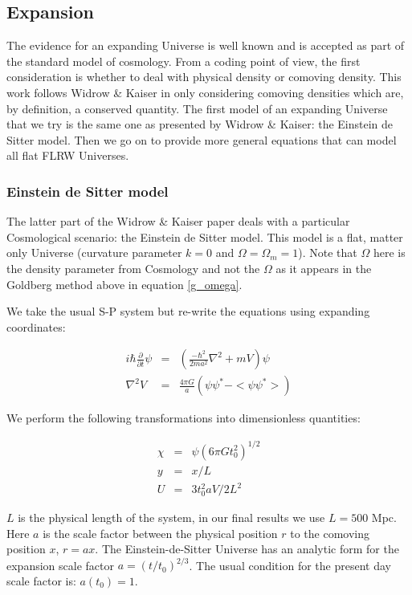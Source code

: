 \subsection{Expansion}
The evidence for an expanding Universe is well known and is accepted as part of the standard model of cosmology. From a coding point of view, the first consideration is whether to deal with physical density or comoving density. This work follows Widrow \& Kaiser in only considering comoving densities which are, by definition, a conserved quantity. The first model of an expanding Universe that we try is the same one as presented by Widrow \& Kaiser: the Einstein de Sitter model. Then we go on to provide more general equations that can model all flat FLRW Universes.

\subsubsection{Einstein de Sitter model}
The latter part of the Widrow \& Kaiser paper deals with a particular Cosmological scenario: the Einstein de Sitter model. This model is a flat, matter only Universe (curvature parameter $k = 0$ and $\Omega = \Omega_m = 1$). Note that $\Omega$ here is the density parameter from Cosmology and not the $\Omega$ as it appears in the Goldberg method above in equation \ref{g_omega}.

We take the usual S-P system but re-write the equations using expanding coordinates:

\begin{eqnarray}
 i \hbar \frac{\partial}{\partial t} \psi &=& \left(\frac{-\hbar^2}{2 m a^2} \nabla^2 +mV\right) \psi \\
 \nabla^2 V &=&  \frac{4\pi G}{a} (\psi\psi^* - <\psi \psi^*>)
\end{eqnarray}

\noindent We perform the following transformations into dimensionless quantities:

\begin{eqnarray}
\chi &=& \psi (6 \pi G t_0^2 )^{1/2} \\
y &=& x/L \\
U &=& 3 t_0^2 a V / 2L^2
\end{eqnarray}

\noindent $L$ is the physical length of the system, in our final results we use $ L = 500$ Mpc. Here $a$ is the scale factor between the physical position $r$ to the comoving position $x$, $r = a x$. The Einstein-de-Sitter Universe has an analytic form for the expansion scale factor $a = (t/t_0)^{2/3}$. The usual condition for the present day scale factor is: $a(t_0) = 1$.

